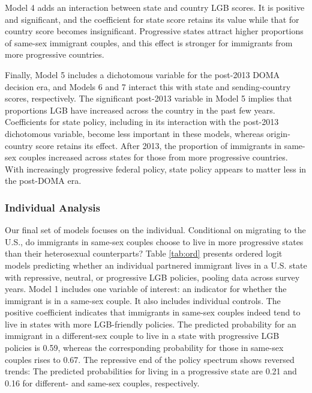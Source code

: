 \documentclass[
  12pt,
]{article}
\begin{document}
Model 4 adds an interaction between state and country LGB scores. It is positive and significant, and the coefficient for state score retains its value while that for country score becomes insignificant. Progressive states attract higher proportions of same-sex immigrant couples, and this effect is stronger for immigrants from more progressive countries.

Finally, Model 5 includes a dichotomous variable for the post-2013 DOMA decision era, and Models 6 and 7 interact this with state and sending-country scores, respectively. The significant post-2013 variable in Model 5 implies that proportions LGB have increased across the country in the past few years. Coefficients for state policy, including in its interaction with the post-2013 dichotomous variable, become less important in these models, whereas origin-country score retains its effect. After 2013, the proportion of immigrants in same-sex couples increased across states for those from more progressive countries. With increasingly progressive federal policy, state policy appears to matter less in the post-DOMA era.

\hypertarget{individual-analysis}{%
\subsubsection{Individual Analysis}\label{individual-analysis}}

Our final set of models focuses on the individual. Conditional on migrating to the U.S., do immigrants in same-sex couples choose to live in more progressive states than their heterosexual counterparts? Table \ref{tab:ord} presents ordered logit models predicting whether an individual partnered immigrant lives in a U.S. state with repressive, neutral, or progressive LGB policies, pooling data across survey years. Model 1 includes one variable of interest: an indicator for whether the immigrant is in a same-sex couple. It also includes individual controls. The positive coefficient indicates that immigrants in same-sex couples indeed tend to live in states with more LGB-friendly policies. The predicted probability for an immigrant in a different-sex couple to live in a state with progressive LGB policies is 0.59, whereas the corresponding probability for those in same-sex couples rises to 0.67. The repressive end of the policy spectrum shows reversed trends: The predicted probabilities for living in a progressive state are 0.21 and 0.16 for different- and same-sex couples, respectively.
\end{document}
